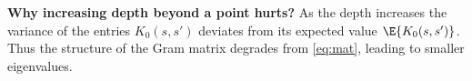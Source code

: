 \textbf{Why increasing depth beyond a point hurts?} 
As the depth increases the variance of the entries $K_0(s,s')$ deviates from its expected value $\E{K_0(s,s')}$. Thus the structure of the Gram matrix degrades from \eqref{eq:mat}, leading to smaller eigenvalues.
\begin{figure}
\end{figure}

